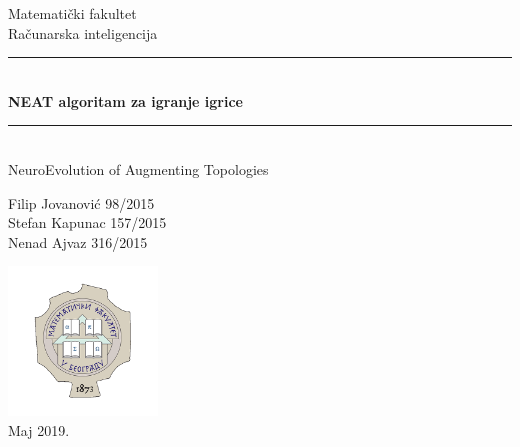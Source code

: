 \documentclass[a4paper]{article}
\begin{document}
\begin{titlepage}

\newcommand{\HRule}{\rule{\linewidth}{0.2mm}} 		%

\center
 

\textmd{\huge Matematički fakultet}\\[0.5cm]
\textmd{\Large Računarska inteligencija}\\[3cm]


\HRule \\[0.4cm]
{\huge \bfseries NEAT algoritam za igranje igrice}		\\[0.2cm]
\HRule \\[0.5cm]

{ \Large{NeuroEvolution of Augmenting Topologies}}		\\[3cm]
 

\begin{flushleft} \large
\Large{Filip Jovanović 	\hspace{0.75cm} 98/2015		}  	\\
\Large{Stefan Kapunac	\hspace{0.35cm} 157/2015	} 	\\
\Large{Nenad Ajvaz		\hspace{1cm} 316/2015	}	\\[2cm]
\end{flushleft}

\includegraphics[width=150px, keepaspectratio]{matf.png}\\

{\large{Maj 2019.}}

\vfill %

\end{titlepage}
\end{document}
